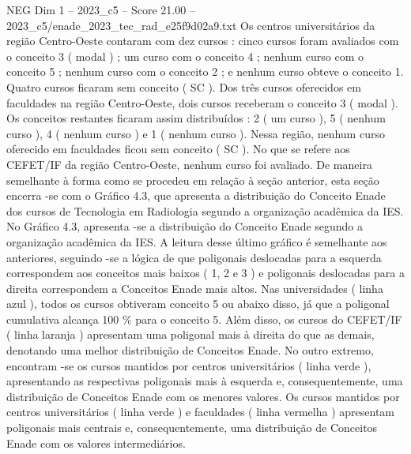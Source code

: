 \begin{textsample}{NEG Dim 1 – 2023\_c5 – Score 21.00 – 2023\_c5/enade\_2023\_tec\_rad\_e25f9d02a9.txt}
Os centros universitários da região Centro-Oeste contaram com dez cursos : cinco cursos foram avaliados com o conceito 3 ( modal ) ; um curso com o conceito 4 ; nenhum curso com o conceito 5 ; nenhum curso com o conceito 2 ; e nenhum curso obteve o conceito 1.
Quatro cursos ficaram sem conceito ( SC ).
Dos três cursos oferecidos em faculdades na região Centro-Oeste, dois cursos receberam o conceito 3 ( modal ).
Os conceitos restantes ficaram assim distribuídos : 2 ( um curso ), 5 ( nenhum curso ), 4 ( nenhum curso ) e 1 ( nenhum curso ).
Nessa região, nenhum curso oferecido em faculdades ficou sem conceito ( SC ).
No que se refere aos CEFET/IF da região Centro-Oeste, nenhum curso foi avaliado.
De maneira semelhante à forma como se procedeu em relação à seção anterior, esta seção encerra -se com o Gráfico 4.3, que apresenta a distribuição do Conceito Enade dos cursos de Tecnologia em Radiologia segundo a organização acadêmica da IES.
No Gráfico 4.3, apresenta -se a distribuição do Conceito Enade segundo a organização acadêmica da IES.
A leitura desse último gráfico é semelhante aos anteriores, seguindo -se a lógica de que poligonais deslocadas para a esquerda correspondem aos conceitos mais baixos ( 1, 2 e 3 ) e poligonais deslocadas para a direita correspondem a Conceitos Enade mais altos.
Nas universidades ( linha azul ), todos os cursos obtiveram conceito 5 ou abaixo disso, já que a poligonal cumulativa alcança 100 \% para o conceito 5.
Além disso, os cursos do CEFET/IF ( linha laranja ) apresentam uma poligonal mais à direita do que as demais, denotando uma melhor distribuição de Conceitos Enade.
No outro extremo, encontram -se os cursos mantidos por centros universitários ( linha verde ), apresentando as respectivas poligonais mais à esquerda e, consequentemente, uma distribuição de Conceitos Enade com os menores valores.
Os cursos mantidos por centros universitários ( linha verde ) e faculdades ( linha vermelha ) apresentam poligonais mais centrais e, consequentemente, uma distribuição de Conceitos Enade com os valores intermediários.

\end{textsample}

